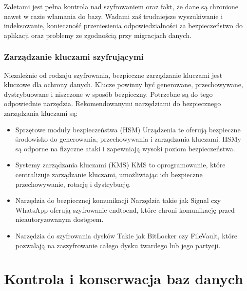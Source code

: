 \documentclass[a4paper,11pt,polish]{sphinxmanual}
\begin{document}
\sphinxAtStartPar
Zaletami jest pełna kontrola nad szyfrowaniem oraz fakt, że dane są chronione nawet w razie włamania do bazy. Wadami zaś trudniejsze wyszukiwanie i indeksowanie, konieczność przeniesienia odpowiedzialności za bezpieczeństwo do aplikacji oraz problemy ze zgodnością przy migracjach danych.


\subsection{Zarządzanie kluczami szyfrującymi}
\label{\detokenize{Bezpieczenstwo/index:zarzadzanie-kluczami-szyfrujacymi}}
\sphinxAtStartPar
Niezależnie od rodzaju szyfrowania, bezpieczne zarządzanie kluczami jest kluczowe dla ochrony danych. Klucze powinny być generowane, przechowywane, dystrybuowane i niszczone w sposób bezpieczny. Potrzebne są do tego odpowiednie narzędzia. Rekomendowanymi narzędziami do bezpiecznego zarządzania kluczami są:
\begin{itemize}
\item {} 
\sphinxAtStartPar
Sprzętowe moduły bezpieczeństwa (HSM) \sphinxhyphen{} Urządzenia te oferują bezpieczne środowisko do generowania, przechowywania i zarządzania kluczami. HSM\sphinxhyphen{}y są odporne na fizyczne ataki i zapewniają wysoki poziom bezpieczeństwa.

\item {} 
\sphinxAtStartPar
Systemy zarządzania kluczami (KMS) \sphinxhyphen{} KMS to oprogramowanie, które centralizuje zarządzanie kluczami, umożliwiając ich bezpieczne przechowywanie, rotację i dystrybucję.

\item {} 
\sphinxAtStartPar
Narzędzia do bezpiecznej komunikacji \sphinxhyphen{} Narzędzia takie jak Signal czy WhatsApp oferują szyfrowanie end\sphinxhyphen{}to\sphinxhyphen{}end, które chroni komunikację przed nieautoryzowanym dostępem.

\item {} 
\sphinxAtStartPar
Narzędzia do szyfrowania dysków \sphinxhyphen{} Takie jak BitLocker czy FileVault, które pozwalają na zaszyfrowanie całego dysku twardego lub jego partycji.

\end{itemize}

\sphinxstepscope


\chapter{Kontrola i konserwacja baz danych}
\label{\detokenize{Kontrola_i_konserwacja/kontrola_i_konserwacja:kontrola-i-konserwacja-baz-danych}}\label{\detokenize{Kontrola_i_konserwacja/kontrola_i_konserwacja::doc}}
\end{document}
